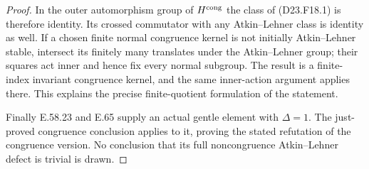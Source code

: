 \begin{proof}
In the outer automorphism group of
$H^{\rm cong}$ the class of (D23.F18.1) is
therefore identity. Its crossed commutator with
any Atkin--Lehner class is identity as well.
If a chosen finite normal congruence kernel is
not initially Atkin--Lehner stable, intersect
its finitely many translates under the
Atkin--Lehner group; their squares act inner
and hence fix every normal subgroup. The
result is a finite-index invariant congruence
kernel, and the same inner-action argument
applies there. This explains the precise
finite-quotient formulation of the statement.

Finally E.58.23 and E.65 supply an actual gentle
element with $\Delta=1$. The just-proved
congruence conclusion applies to it, proving
the stated refutation of the congruence version.
No conclusion that its full noncongruence
Atkin--Lehner defect is trivial is drawn.
\end{proof}
